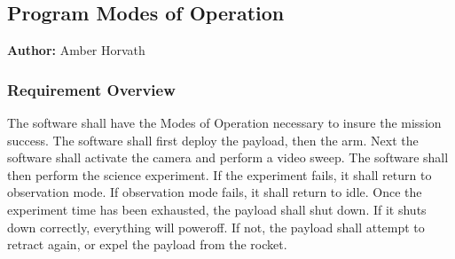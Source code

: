 \documentclass[letterpaper,10pt]{article}
\begin{document}
\subsection{Program Modes of Operation}
\textbf{Author:} Amber Horvath
\subsubsection{Requirement Overview}
The software shall have the Modes of Operation necessary to insure the mission success.
The software shall first deploy the payload, then the arm. Next the software shall activate the 
camera and perform a video sweep. The software shall then perform the science experiment.
If the experiment fails, it shall return to observation mode.
If observation mode fails, it shall return to idle.
Once the experiment time has been exhausted, the payload shall shut down.
If it shuts down correctly, everything will poweroff. If not, the payload shall attempt to retract 
again, or expel the payload from the rocket.
\end{document}
